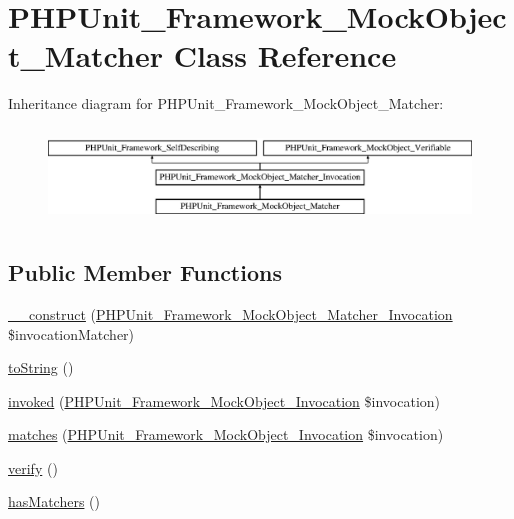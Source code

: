 \hypertarget{class_p_h_p_unit___framework___mock_object___matcher}{}\section{P\+H\+P\+Unit\+\_\+\+Framework\+\_\+\+Mock\+Object\+\_\+\+Matcher Class Reference}
\label{class_p_h_p_unit___framework___mock_object___matcher}
Inheritance diagram for P\+H\+P\+Unit\+\_\+\+Framework\+\_\+\+Mock\+Object\+\_\+\+Matcher\+:\begin{figure}[H]
\begin{center}
\leavevmode
\includegraphics[height=2.545455cm]{class_p_h_p_unit___framework___mock_object___matcher}
\end{center}
\end{figure}
\subsection*{Public Member Functions}
\begin{DoxyCompactItemize}
\item 
\mbox{\hyperlink{class_p_h_p_unit___framework___mock_object___matcher_ad0ec063be7be4226ae17051b797e7c12}{\+\_\+\+\_\+construct}} (\mbox{\hyperlink{interface_p_h_p_unit___framework___mock_object___matcher___invocation}{P\+H\+P\+Unit\+\_\+\+Framework\+\_\+\+Mock\+Object\+\_\+\+Matcher\+\_\+\+Invocation}} \$invocation\+Matcher)
\item 
\mbox{\hyperlink{class_p_h_p_unit___framework___mock_object___matcher_a5558c5d549f41597377fa1ea8a1cefa3}{to\+String}} ()
\item 
\mbox{\hyperlink{class_p_h_p_unit___framework___mock_object___matcher_a63f37b06181c9547bc3c225007c34425}{invoked}} (\mbox{\hyperlink{interface_p_h_p_unit___framework___mock_object___invocation}{P\+H\+P\+Unit\+\_\+\+Framework\+\_\+\+Mock\+Object\+\_\+\+Invocation}} \$invocation)
\item 
\mbox{\hyperlink{class_p_h_p_unit___framework___mock_object___matcher_a4988c6fa11e275302172d0a4ae32dd3a}{matches}} (\mbox{\hyperlink{interface_p_h_p_unit___framework___mock_object___invocation}{P\+H\+P\+Unit\+\_\+\+Framework\+\_\+\+Mock\+Object\+\_\+\+Invocation}} \$invocation)
\item 
\mbox{\hyperlink{class_p_h_p_unit___framework___mock_object___matcher_aa33600b6a1b28d0c4dfe4d468272aaa4}{verify}} ()
\item 
\mbox{\hyperlink{class_p_h_p_unit___framework___mock_object___matcher_a81f246fc919f5043e206cc59f9bd3ed1}{has\+Matchers}} ()
\end{DoxyCompactItemize}
